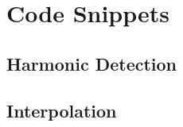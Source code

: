 \documentclass{article}[a4paper]
\begin{document}
	\appendix
	\section{Code Snippets}
	\label{code}
	
	\subsection{Harmonic Detection}
	
	\subsection{Interpolation}
	
\end{document}
